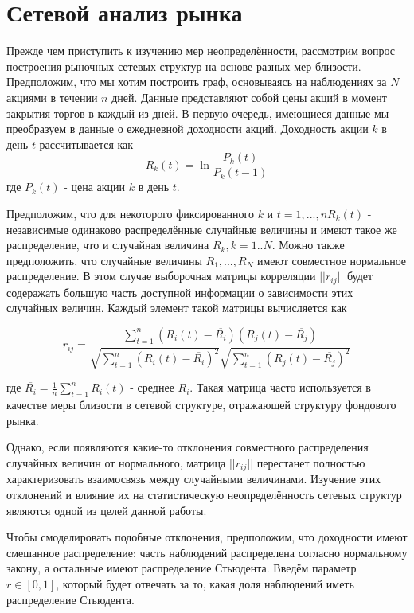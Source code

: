 \section{Сетевой анализ рынка}
Прежде чем приступить к изучению мер неопределённости, рассмотрим вопрос построения рыночных сетевых структур на основе разных мер близости. Предположим, что мы хотим построить граф, основываясь на наблюдениях за $N$ акциями в течении $n$ дней. Данные представляют собой цены акций в момент закрытия торгов в каждый из дней. В первую очередь, имеющиеся данные мы преобразуем в данные о ежедневной доходности акций. Доходность акции $k$ в день $t$ рассчитывается как	
\begin{equation}
	R_k(t)=\ln\frac{P_k(t)}{P_k(t-1)}
\end{equation}
где $P_k(t)$ -  цена акции $k$ в день $t$. 

Предположим, что для некоторого фиксированного $k$ и $t=1,...,n R_k(t)$ - независимые одинаково распределённые случайные величины и имеют такое же распределение, что и случайная величина $R_k, k=1..N$. Можно также предположить, что случайные величины $R_1, ... ,R_N$ имеют совместное нормальное распределение. В этом случае выборочная матрицы корреляции $||r_{i j}||$ будет содеражать большую часть доступной информации о зависимости этих случайных величин\cite{anderson}. Каждый элемент такой матрицы вычисляется как 

\begin{equation}
	r_{i j} = \frac{ \sum_{t=1}^{n} (R_i(t) - \overline{R_i})(R_j(t) - \overline{R_j})  }{ \sqrt{ \sum_{t=1}^{n} (R_i(t) - \overline{R_i})^2 }\sqrt{ \sum_{t=1}^{n} (R_j(t) - \overline{R_j})^2 } }
\end{equation}

где $\overline{R_i} =  \frac{1}{n}\sum_{t=1}^{n} R_i(t)$ - среднее $R_i$. Такая матрица часто используется в качестве меры близости в сетевой структуре, отражающей структуру фондового рынка.

Однако, если появляются какие-то отклонения совместного распределения случайных величин от нормального, матрица $||r_{i j}||$ перестанет полностью характеризовать взаимосвязь между случайными величинами. Изучение этих отклонений и влияние их на статистическую неопределённость сетевых структур являются одной из целей данной работы. 

Чтобы смоделировать подобные отклонения, предположим, что доходности имеют смешанное распределение: часть наблюдений распределена согласно нормальному закону, а остальные имеют распределение Стьюдента. Введём параметр $r \in [0,1]$, который будет отвечать за то, какая доля наблюдений иметь распределение Стьюдента.

